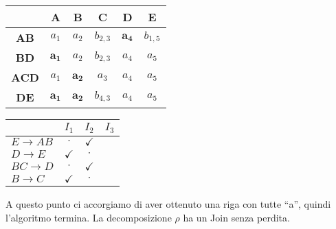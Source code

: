   \begin{multicols}{2}
   \begin{center}
  \begin{tabular}{c|c|c|c|c|c}
    & \textbf{A} & \textbf{B} &\textbf{C} &\textbf{D}     &\textbf{E}\\
   \hline
   \textbf{AB} & $a_1$ & $a_2$ & $b_{2,3}$ & $\mathbf{a_4}$ & $b_{1,5}$ \\
   \hline
   \textbf{BD}  &$\mathbf{a_1}$ & $a_2$  & $b_{2,3}$ & $a_4$ & $a_5$ \\
   \hline
   \textbf{ACD} & $a_1$ & $\mathbf{a_2}$  & $a_3$ & $a_4$ & $a_5$\\
    \hline
   \textbf{DE} & $\mathbf{a_1}$ & $\mathbf{a_2}$  & $b_{4,3}$ & $a_4$ & $a_5$\\
  \end{tabular}
 \end{center}
 
  \begin{center}
  \begin{tabular}{l|c|c|c}
   & $I_1$ & $I_2$ & $I_3$\\
   \hline
   $E\rightarrow AB$ & $\cdot$ & $\checkmark$ \\
   $D\rightarrow E$ & $\checkmark$ & $\cdot$ \\
   $BC\rightarrow D$ & $\cdot$ & $\checkmark$ \\
   $B\rightarrow C$ & $\checkmark$ & $\cdot$ \\
   \end{tabular}
 \end{center}
 \end{multicols}
A questo punto ci accorgiamo di aver ottenuto una riga con tutte ``a'', quindi l'algoritmo termina. La decomposizione $\rho$ 
ha un Join senza perdita.

 
